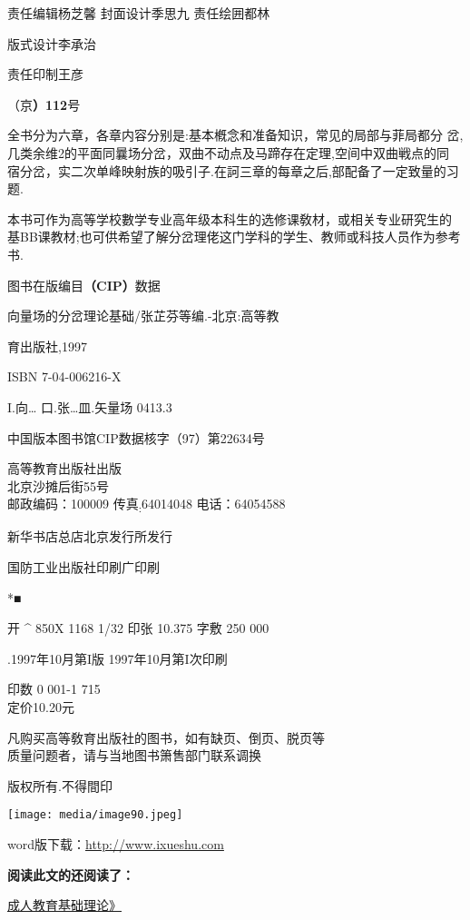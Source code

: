 \documentclass{article}
\begin{document}
责任编辑杨芝馨 封面设计季思九 责任绘囲都林

版式设计李承治

责任印制王彦

（京\textbf{）112}号

全书分为六章，各章内容分别是:基本槪念和准备知识，常见的局部与菲局都分
岔,几类余维2的平面同曩场分岔，双曲不动点及马蹄存在定理,空间中双曲戦点的同
宿分岔，实二次单峰映射族的吸引子.在訶三章的每章之后,部配备了一定致量的习
题.

本书可作为高等学校數学专业高年级本科生的选修课敎材，或相关专业研究生的
基BB课教材;也可供希望了解分岔理佬这门学科的学生、教师或科技人员作为参考书.

图书在版编目\textbf{（CIP）}数据

向量场的分岔理论基础/张芷芬等编.-北京:高等教

育出版社,1997

ISBN 7-04-006216-X

I.向\ldots{} 口.张\ldots{}皿.矢量场 0413.3

中国版本图书馆CIP数据核字（97）第22634号

高等教育出版社出版\\
北京沙摊后街55号\\
邮政编码：100009 传真\textsubscript{:}64014048 电话：64054588

新华书店总店北京发行所发行

国防工业出版社印刷广印刷

*■

开 \^{} 850X 1168 1/32 印张 10.375 字敷 250 000

.1997年10月第I版 1997年10月第I次印刷

印数 0 001-1 715\\
定价10.20元

凡购买高等敎育出版社的图书，如有缺页、倒页、脱页等\\
质量问题者，请与当地图书箫售部门联系调换

版权所有.不得間印

\texttt{[image: media/image90.jpeg]}

word版下载：\href{https://www.ixueshu.com/api/search/info/a3581eaaa81c186f5dde17aced68889d318947a18e7f9386.html?from=pdf\&ck=PTW}{{http://www.ixueshu.com}}

\textbf{阅读此文的还阅读了：}

\href{https://www.ixueshu.com/api/search/info/e4859208ffe87b819e1ea67c33098024318947a18e7f9386.html?from=pdf}{成人教育基础理论》}
\end{document}
